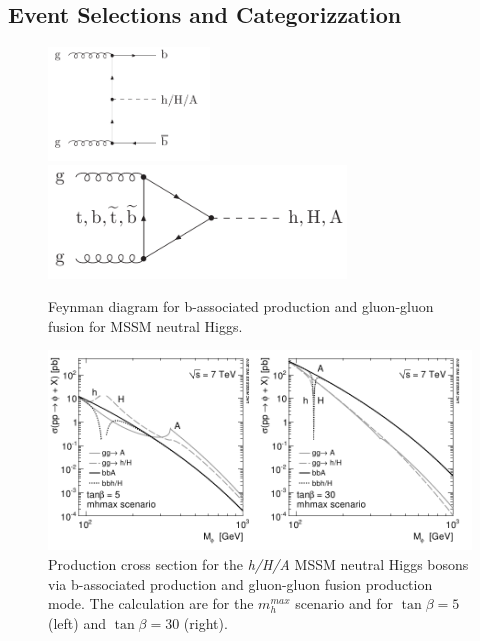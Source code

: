 \subsection{Event Selections and Categorizzation}\label{sec:topology}


\begin{figure}[tp]
     \begin{center}

            \includegraphics[height=3cm]{figure/bba.png}
            \includegraphics[height=3cm]{figure/ggf.png}

    \end{center}
    \caption{Feynman diagram for b-associated production and gluon-gluon fusion for MSSM neutral Higgs.}
   \label{fig:prod}
\end{figure}

\begin{figure}[tp]
     \begin{center}

            \includegraphics[width=\textwidth]{figure/xsec.png}

    \end{center}
    \caption{Production cross section for the \emph{h/H/A} MSSM neutral Higgs bosons via b-associated production and
	gluon-gluon fusion production mode. The calculation are for the $m_h^{max}$ scenario and for $\tan \beta=5$ (left) and $\tan \beta=30$ (right).}
   \label{fig:xsec}
\end{figure}

